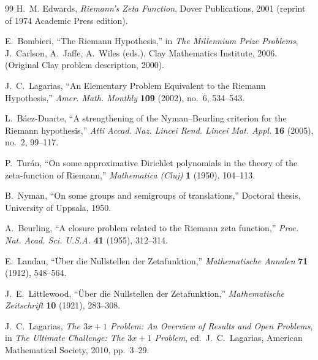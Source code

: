 \documentclass[11pt]{article}
\theoremstyle{plain}
\theoremstyle{definition}
\theoremstyle{remark}
\begin{document}
\begin{thebibliography}{99}
H.~M. Edwards,
\newblock \emph{Riemann’s Zeta Function}, 
\newblock Dover Publications, 2001 (reprint of 1974 Academic Press edition).

E.~Bombieri,
\newblock ``The Riemann Hypothesis,'' 
\newblock in \emph{The Millennium Prize Problems}, J.~Carlson, A.~Jaffe, A.~Wiles (eds.), Clay Mathematics Institute, 2006. 
(Original Clay problem description, 2000).

J.~C.~Lagarias,
``An Elementary Problem Equivalent to the Riemann Hypothesis,''
\emph{Amer. Math. Monthly} \textbf{109} (2002), no.~6, 534--543.

L.~Báez-Duarte,
``A strengthening of the Nyman--Beurling criterion for the Riemann hypothesis,''
\emph{Atti Accad. Naz. Lincei Rend. Lincei Mat. Appl.} \textbf{16} (2005), no.~2, 99--117.

P.~Turán,
``On some approximative Dirichlet polynomials in the theory of the zeta-function of Riemann,''
\emph{Mathematica (Cluj)} \textbf{1} (1950), 104--113.

B.~Nyman,
``On some groups and semigroups of translations,''
Doctoral thesis, University of Uppsala, 1950.

A.~Beurling,
``A closure problem related to the Riemann zeta function,''
\emph{Proc. Nat. Acad. Sci. U.S.A.} \textbf{41} (1955), 312--314.

E.~Landau, ``Über die Nullstellen der Zetafunktion,'' 
\emph{Mathematische Annalen} \textbf{71} (1912), 548--564.

J.~E.~Littlewood, ``Über die Nullstellen der Zetafunktion,'' 
\emph{Mathematische Zeitschrift} \textbf{10} (1921), 283--308.

J.~C.~Lagarias,
\newblock \emph{The $3x+1$ Problem: An Overview of Results and Open Problems},
\newblock in \emph{The Ultimate Challenge: The $3x+1$ Problem}, ed.~J.~C.~Lagarias, 
American Mathematical Society, 2010, pp.~3--29.

\end{thebibliography}
\end{document}
